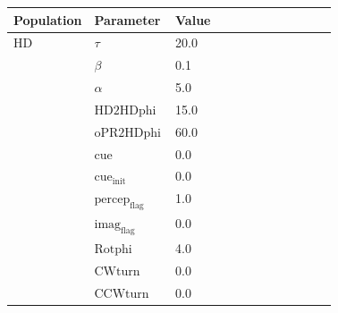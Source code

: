 \documentclass{article}
\begin{document}
\noindent
\begin{tabularx}{\linewidth}{|p{0.25\linewidth}|p{0.25\linewidth}|X|}\hline
\textbf{Population} & \textbf{Parameter} & \textbf{Value}   \\ \hline

    HD             & $\tau$        & 20.0  \\ \hline

                 & $\beta$        & 0.1  \\ \hline

                 & $\alpha$        & 5.0  \\ \hline

                 & ${\text{HD2HDphi}}$        & 15.0  \\ \hline

                 & ${\text{oPR2HDphi}}$        & 60.0  \\ \hline

                 & ${\text{cue}}$        & 0.0  \\ \hline

                 & ${\text{cue}}_{\text{init}}$        & 0.0  \\ \hline

                 & ${\text{percep}}_{\text{flag}}$        & 1.0  \\ \hline

                 & ${\text{imag}}_{\text{flag}}$        & 0.0  \\ \hline

                 & ${\text{Rotphi}}$        & 4.0  \\ \hline

                 & ${\text{CWturn}}$        & 0.0  \\ \hline

                 & ${\text{CCWturn}}$        & 0.0  \\ \hline

\end{tabularx}

\vspace{2ex}
\end{document}

